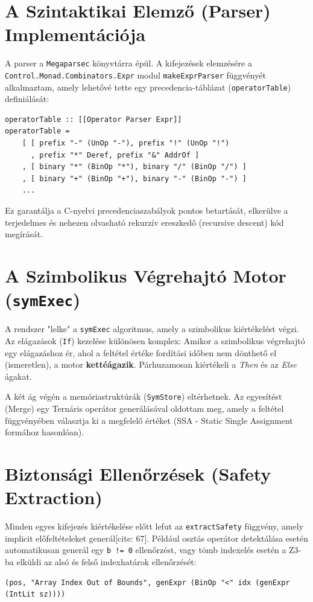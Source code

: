 \documentclass[
    hungarian,
    parspace
]{elteikthesis}
\begin{document}
\section{A Szintaktikai Elemző (Parser) Implementációja}
A parser a \texttt{Megaparsec} könyvtárra épül. A kifejezések elemzésére a \texttt{Control.Monad.Combinators.Expr} modul \texttt{makeExprParser} függvényét alkalmaztam, amely lehetővé tette egy precedencia-táblázat (\texttt{operatorTable}) definiálását:
\begin{verbatim}
operatorTable :: [[Operator Parser Expr]]
operatorTable =
    [ [ prefix "-" (UnOp "-"), prefix "!" (UnOp "!") 
      , prefix "*" Deref, prefix "&" AddrOf ]
    , [ binary "*" (BinOp "*"), binary "/" (BinOp "/") ]
    , [ binary "+" (BinOp "+"), binary "-" (BinOp "-") ]
    ...
\end{verbatim}
Ez garantálja a C-nyelvi precedenciaszabályok pontos betartását, elkerülve a terjedelmes és nehezen olvasható rekurzív ereszkedő (recursive descent) kód megírását.

\section{A Szimbolikus Végrehajtó Motor (\texttt{symExec})}
A rendszer "lelke" a \texttt{symExec} algoritmus, amely a szimbolikus kiértékelést végzi. Az elágazások (\texttt{If}) kezelése különösen komplex:
Amikor a szimbolikus végrehajtó egy elágazáshoz ér, ahol a feltétel értéke fordítási időben nem dönthető el (ismeretlen), a motor \textbf{kettéágazik}. Párhuzamosan kiértékeli a \textit{Then} és az \textit{Else} ágakat. 

A két ág végén a memóriastruktúrák (\texttt{SymStore}) eltérhetnek. Az egyesítést (Merge) egy Ternáris operátor generálásával oldottam meg, amely a feltétel függvényében választja ki a megfelelő értéket (SSA - Static Single Assignment formához hasonlóan).

\section{Biztonsági Ellenőrzések (Safety Extraction)}
Minden egyes kifejezés kiértékelése előtt lefut az \texttt{extractSafety} függvény, amely implicit előfeltételeket generál[cite: 67]. Például osztás operátor detektálása esetén automatikusan generál egy \texttt{b != 0} ellenőrzést, vagy tömb indexelés esetén a Z3-ba elküldi az alsó és felső indexhatárok ellenőrzését:
\begin{verbatim}
(pos, "Array Index Out of Bounds", genExpr (BinOp "<" idx (genExpr (IntLit sz))))
\end{verbatim}
\end{document}
